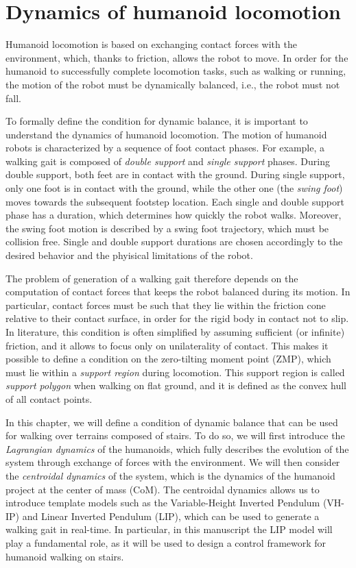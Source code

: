 \chapter{Dynamics of humanoid locomotion}
\label{ch:humanoid-locomotion-dynamics}
Humanoid locomotion is based on exchanging contact forces with the environment,
which, thanks to friction, allows the robot to move. In order for the humanoid to
successfully complete locomotion tasks, such as walking or running, the motion
of the robot must be dynamically balanced, i.e., the robot must not fall.

To formally define the condition for dynamic balance, it is important
to understand the dynamics of humanoid locomotion. The motion of humanoid robots
is characterized by a sequence of foot contact phases. For example, a walking
gait is composed of \textit{double support} and \textit{single support} phases. During
double support, both feet are in contact with the ground. During single support,
only one foot is in contact with the ground, while the other one (the \textit{swing foot})
moves towards the subsequent footstep location. Each single and double support
phase has a duration, which determines how quickly the robot walks. Moreover,
the swing foot motion is described by a swing foot trajectory, which must be
collision free. Single and double support durations are chosen accordingly to 
the desired behavior and the phyisical limitations of the robot.

The problem of generation of a walking gait therefore depends on the
computation of contact forces that keeps the robot balanced during its motion.
In particular, contact forces must be such that they lie within the friction cone
relative to their contact surface, in order for the rigid body in contact not to slip. 
In literature, this condition is often simplified by assuming sufficient (or
infinite) friction, and it allows to focus only on unilaterality of contact.
This makes it possible to define a condition on the zero-tilting moment point
(ZMP), which must lie within a \textit{support region} during locomotion. This
support region is called \textit{support polygon} when walking on flat ground,
and it is defined as the convex hull of all contact points.

In this chapter, we will define a condition of dynamic balance that can be
used for walking over terrains composed of stairs. To do so, we will first introduce the 
\textit{Lagrangian dynamics} of the humanoids, which fully describes the evolution
of the system through exchange of forces with the environment. We will then 
consider the \textit{centroidal dynamics} of the system, which is the 
dynamics of the humanoid project at the center of mass (CoM). The centroidal
dynamics allows us to introduce template models such as the Variable-Height
Inverted Pendulum (VH-IP) and Linear Inverted Pendulum (LIP), which can be used to generate
a walking gait in real-time. In particular, in this manuscript the LIP model
will play a fundamental role, as it will be used to design a control framework
for humanoid walking on stairs.

